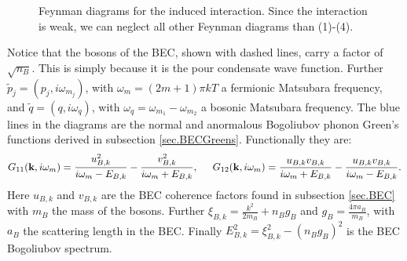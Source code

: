 \begin{figure}
\caption{Feynman diagrams for the induced interaction. Since the interaction is weak, we can neglect all other Feynman diagrams than (1)-(4). } \label{fig.feynmandiagrams}
\end{figure}

Notice that the bosons of the BEC, shown with dashed lines, carry a factor of $\sqrt{n_B}$. This is simply because it is the pour condensate wave function. Further $\tilde{p}_j = (p_j, i\omega_{m_j})$, with $\omega_{m} = (2m+1)\pi kT$ a fermionic Matsubara frequency, and $\tilde{q} = (q, i\omega_q )$, with $\omega_q = \omega_{m_1}-\omega_{m_2}$ a bosonic Matsubara frequency. The blue lines in the diagrams are the normal and anormalous Bogoliubov phonon Green's functions derived in subsection \ref{sec.BECGreens}. Functionally they are:
\begin{equation}
G_{11}(\mathbf{k},i\omega_m) = \frac{u_{B,k}^2}{i\omega_m-E_{B,k}}-\frac{v_{B,k}^2}{i\omega_m+E_{B,k}}, \hspace{0.5cm} G_{12}(\mathbf{k},i\omega_m) = \frac{u_{B,k}v_{B,k}}{i\omega_m+E_{B,k}}-\frac{u_{B,k}v_{B,k}}{i\omega_m-E_{B,k}}.\nonumber
\end{equation}
Here $u_{B,k}$ and $v_{B,k}$ are the BEC coherence factors found in subsection \ref{sec.BEC} with $m_B$ the mass of the bosons. Further $\xi_{B,k} = \frac{k^2}{2m_B}+n_Bg_B$ and $g_B = \frac{4\pi a_B}{m_B}$, with $a_B$ the scattering length in the BEC. Finally $E_{B,k}^2 = \xi_{B,k}^2-(n_Bg_B)^2$ is the BEC Bogoliubov spectrum.

